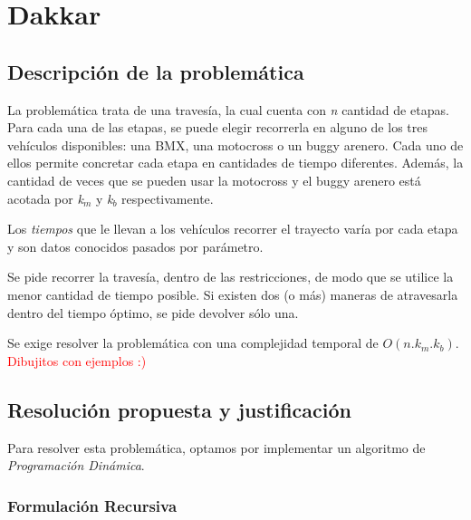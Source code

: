 \section{Dakkar}
\subsection{Descripci\'on de la problem\'atica}
La problem\'atica trata de una traves\'ia, la cual cuenta con \emph{n} cantidad de etapas. Para cada una de las etapas, se puede elegir recorrerla en alguno de los tres veh\'iculos disponibles: una BMX, una motocross o un buggy arenero. Cada uno de ellos permite concretar cada etapa en cantidades de tiempo diferentes. Adem\'as, la cantidad de veces que se pueden usar la motocross y el buggy arenero est\'a acotada por \emph{k}$_m$ y \emph{k}$_b$ respectivamente.

Los \emph{tiempos} que le llevan a los veh\'iculos recorrer el trayecto var\'ia por cada etapa y son datos conocidos pasados por par\'ametro.

Se pide recorrer la traves\'ia, dentro de las restricciones, de modo que se utilice la menor cantidad de tiempo posible. Si existen dos (o m\'as) maneras de atravesarla dentro del tiempo \'optimo, se pide devolver s\'olo una.

Se exige resolver la problem\'atica con una complejidad temporal de $O(n.k_m.k_b)$.\\

\textcolor{red}{Dibujitos con ejemplos :)}

\newpage
\subsection{Resoluci\'on propuesta y justificaci\'on}

Para resolver esta problem\'atica, optamos por implementar un algoritmo de \emph{Programaci\'on Din\'amica}.\\

\subsubsection*{Formulaci\'on Recursiva}

